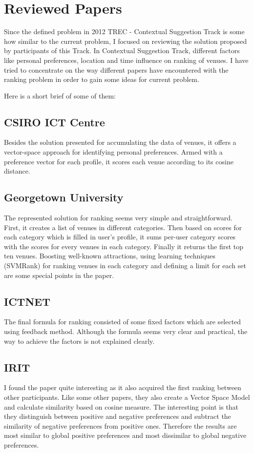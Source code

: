 \section{Reviewed Papers}
Since the defined problem in 2012 TREC - Contextual Suggestion Track is some how similar to the current problem, I focused on reviewing the solution proposed by participants of this Track. In Contextual Suggestion Track, different factors like personal preferences, location and time influence on ranking of venues. I have tried to concentrate on the way different papers have encountered with the ranking problem in order to gain some ideas for current problem.

Here is a short brief of some of them:

\subsection{CSIRO ICT Centre \cite{CSIRO}} 
Besides the solution presented for accumulating the data of venues, it offers a vector-space approach for identifying personal preferences. Armed with a preference vector for each profile, it scores each venue according to its cosine distance.

\subsection{Georgetown University \cite{GeorgetownUniversity}}
The represented solution for ranking seems very simple and straightforward. First, it creates a list of venues in different categories. Then based on scores for each category which is filled in user's profile, it sums per-user category scores with the scores for every venues in each category. Finally it returns the first top ten venues. Boosting well-known attractions, using learning techniques (SVMRank) for ranking venues in each category and defining a limit for each set are some special points in the paper.

\subsection{ICTNET \cite{ICTNET}}
The final formula for ranking consisted of some fixed factors which are selected using feedback method. Although the formula seems very clear and practical, the way to achieve the factors is not explained clearly.

\subsection{IRIT \cite{IRIT}}
I found the paper quite interesting as it also acquired the first ranking between other participants. Like some other papers, they also create a Vector Space Model and calculate similarity based on cosine measure. The interesting point is that they distinguish between positive and negative preferences and subtract the similarity of negative preferences from positive ones. Therefore the results are most similar to global positive preferences and most dissimilar to global negative preferences.

